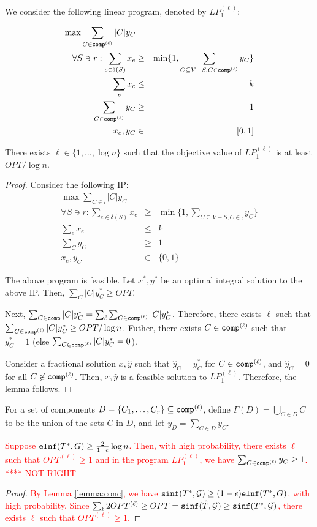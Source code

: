 We consider the following linear program, denoted by $LP_1^{(\ell)}$:

\begin{eqnarray}
\nonumber
\max  \sum_{C\in\texttt{comp}^{(\ell)}} |C|y_C  && \\
\forall S\ni r: \sum_{e\in\delta(S)} x_e &\geq& \min\{1, \sum_{C\subseteq V-S, C\in\texttt{comp}^{(\ell)}} y_C\}\\
\sum_e x_e &\leq& k\\
\sum_{C\in\texttt{comp}^{(\ell)}} y_C &\geq& 1\\
x_e, y_C &\in& [0, 1]
\end{eqnarray}

\begin{lemma}
\label{lemma:lp-approx}
There exists $\ell\in\{1,\ldots,\log{n}\}$ such that the objective value of $LP_1^{(\ell)}$ is at least $OPT/\log{n}$.
\end{lemma}
\begin{proof}
Consider the following IP:
\begin{eqnarray*}
\nonumber
\max  \sum_{C\in\comp} |C|y_C  && \\
\forall S\ni r: \sum_{e\in\delta(S)} x_e &\geq& \min\{1, \sum_{C\subseteq V-S, C\in\comp} y_C\}\\
\sum_e x_e &\leq& k\\
\sum_C y_C &\geq& 1\\
x_e, y_C &\in& \{0, 1\}
\end{eqnarray*}

The above program is feasible. Let $x^*, y^*$ be an optimal integral solution to the above IP.
Then, $\sum_C |C|y^*_C\geq OPT$.

Next, $\sum_{C\in\texttt{comp}} |C|y^*_C=\sum_{\ell}\sum_{C\in\texttt{comp}^{(\ell)}} |C|y^*_C$. Therefore, there exists $\ell$ such that
$\sum_{C\in\texttt{comp}^{(\ell)}} |C|y^*_C\geq OPT/\log{n}$. Futher, there exists $C\in\texttt{comp}^{(\ell)}$ such that $y^*_C=1$
(else $\sum_{C\in\texttt{comp}^{(\ell)}} |C|y^*_C=0$).


Consider a fractional solution $x, \hat{y}$ such that $\hat{y}_C=y^*_C$ for $C\in\texttt{comp}^{(\ell)}$, and 
$\hat{y}_C=0$ for all $C\not\in\texttt{comp}^{(\ell)}$. Then, $x, \hat{y}$ is a feasible solution to $LP_1^{(\ell)}$.
Therefore, the lemma follows.
\end{proof}

For a set of components $D=\{C_1,\ldots,C_r\}\subseteq\texttt{comp}^{(\ell)}$, define $\Gamma(D)=\bigcup_{C\in D} C$ to be the union of the sets $C$ in $D$, and let $y_D=\sum_{C\in D} y_C$.

\begin{lemma}
\textcolor{red}{Suppose $\texttt{eInf}(T^*, G)\geq \frac{2}{1-\epsilon}\log{n}$. Then, with high probability, there exists $\ell$ such that $OPT^{(\ell)}\geq 1$ and in the program $LP_1^{(\ell)}$, we have $\sum_{C\in\texttt{comp}^{(\ell)}} y_C\geq 1$. **** NOT RIGHT}
\end{lemma}
\begin{proof}
\textcolor{red}{By Lemma \ref{lemma:conc}, we have $\texttt{sinf}(T^*, \mathcal{G})\geq (1-\epsilon)\texttt{eInf}(T^*, G)$, with high probability. Since $\sum_{\ell} 2OPT^{(\ell)}\geq OPT=\texttt{sinf}(\hat{T},\mathcal{G})\geq\texttt{sinf}(T^*,\mathcal{G})$, there exists $\ell$ such that $OPT^{(\ell)}\geq 1$.}
\end{proof}

